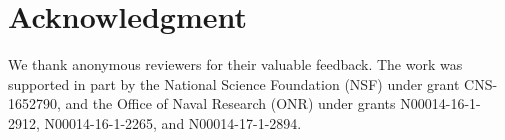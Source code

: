 \documentclass[10pt,conference]{IEEEtran}
\begin{document}
\section*{Acknowledgment}
We thank anonymous reviewers for their valuable feedback. The work was supported in part by the National Science Foundation (NSF) under grant CNS-1652790, and the Office of Naval Research (ONR) under grants N00014-16-1-2912, N00014-16-1-2265, and N00014-17-1-2894. 





\end{document}
